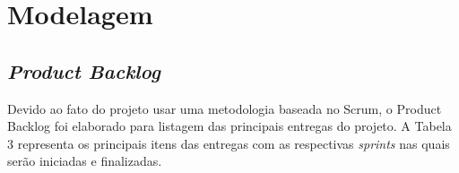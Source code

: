 \documentclass[
    12pt,               %
    openright,          %
    oneside,
    a4paper,            %
    paginasA3,  %
    english,            %
    brazil              %
    ]{ifsp-spo-inf-ctds} %
\begin{document}

\section{Modelagem}
\subsection{\textit{Product Backlog}}
Devido ao fato do projeto usar uma metodologia baseada no Scrum, o Product Backlog foi elaborado para listagem das principais entregas do projeto. A Tabela 3 representa os principais itens das entregas com as respectivas \textit{\glspl{sprint}} nas quais serão iniciadas e finalizadas.
\end{document}
